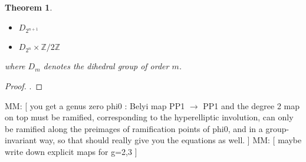 \documentclass{dcthesis}
\newcommand{\PP}{\mathbb P}
\newcommand{\CC}{\mathbb C}
\newcommand{\ZZ}{\mathbb Z}
\newcommand{\mm}[1]{{\color{blue} \sf MM: [#1]}}
\DeclareMathOperator{\Aut}{Aut}
\DeclareMathOperator{\PGL}{PGL}
\numberwithin{equation}{section}
\newtheorem{theorem}[equation]{Theorem}
\theoremstyle{definition}
\theoremstyle{remark}
\begin{document}
{{\begin{theorem}
\begin{itemize}
          $\ZZ / 2^n\ZZ\times\ZZ / 2\ZZ$
        \item
          $D_{2^{n+1}}$
        \item
          $D_{2^n}\times\ZZ / 2\ZZ$
      \end{itemize}
      where $D_m$ denotes the dihedral group of order $m$.
    \end{theorem}
    \begin{proof}
      \cite[Theorem 2.1]{hyperelliptic}.
    \end{proof}
    \mm{
      you get a genus zero phi0 : Belyi map
      PP1 $\to$ PP1 and the degree 2 map on top must be ramified,
      corresponding to the hyperelliptic involution, can only be ramified
      along the preimages of ramification points of phi0, and in a
      group-invariant way, so that should really give you the equations as
      well.
    }
    \newline
    \mm{
      maybe write down explicit maps for g=2,3
    }
  }
}
\end{document}
